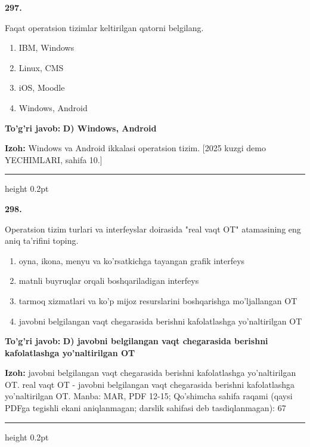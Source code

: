 \documentclass[10pt,a4paper]{article}
\begin{document}
{\bfseries\sffamily\color{ink} 297.}
\par
Faqat operatsion tizimlar keltirilgan qatorni belgilang.
\begin{enumerate}[label=\Alph*),leftmargin=9mm]
\item IBM, Windows
\item Linux, CMS
\item iOS, Moodle
\item Windows, Android
\end{enumerate}
\begin{tcolorbox}[enhanced,breakable,colback=teal!4,colframe=teal!60!black,boxrule=0.45pt,arc=1.2mm,left=2.7mm,right=2.7mm,top=1.8mm,bottom=1.8mm,before skip=2mm,after skip=2mm]
{\bfseries\sffamily\color{teal}To'g'ri javob:} \textbf{D) Windows, Android}
\par\smallskip
{\bfseries Izoh:} Windows va Android ikkalasi operatsion tizim. [2025 kuzgi demo YECHIMLARI, sahifa 10.]
\end{tcolorbox}
\vspace{2mm}\hrule height 0.2pt\vspace{3mm}


{\bfseries\sffamily\color{ink} 298.}
\par
Operatsion tizim turlari va interfeyslar doirasida "real vaqt OT" atamasining eng aniq ta'rifini toping.
\begin{enumerate}[label=\Alph*),leftmargin=9mm]
\item oyna, ikona, menyu va ko'rsatkichga tayangan grafik interfeys
\item matnli buyruqlar orqali boshqariladigan interfeys
\item tarmoq xizmatlari va ko'p mijoz resurslarini boshqarishga mo'ljallangan OT
\item javobni belgilangan vaqt chegarasida berishni kafolatlashga yo'naltirilgan OT
\end{enumerate}
\begin{tcolorbox}[enhanced,breakable,colback=teal!4,colframe=teal!60!black,boxrule=0.45pt,arc=1.2mm,left=2.7mm,right=2.7mm,top=1.8mm,bottom=1.8mm,before skip=2mm,after skip=2mm]
{\bfseries\sffamily\color{teal}To'g'ri javob:} \textbf{D) javobni belgilangan vaqt chegarasida berishni kafolatlashga yo'naltirilgan OT}
\par\smallskip
{\bfseries Izoh:} javobni belgilangan vaqt chegarasida berishni kafolatlashga yo'naltirilgan OT. real vaqt OT - javobni belgilangan vaqt chegarasida berishni kafolatlashga yo'naltirilgan OT. Manba: MAR, PDF 12-15; Qo'shimcha sahifa raqami (qaysi PDFga tegishli ekani aniqlanmagan; darslik sahifasi deb tasdiqlanmagan): 67
\end{tcolorbox}
\vspace{2mm}\hrule height 0.2pt\vspace{3mm}
\end{document}

